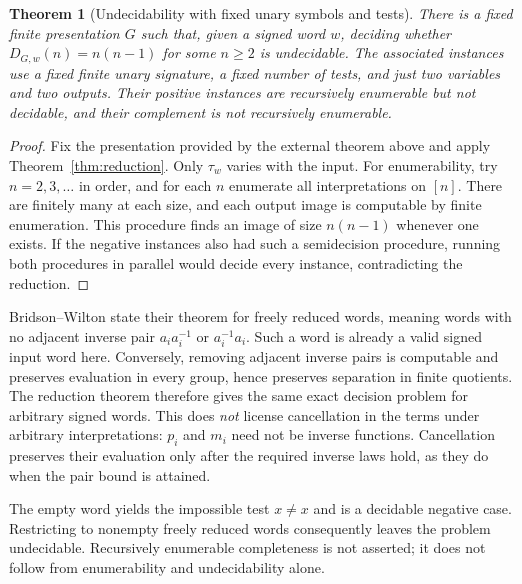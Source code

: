 \documentclass[12pt]{article}
\newtheorem{theorem}{Theorem}[section]
\theoremstyle{definition}
\begin{document}
\begin{theorem}[Undecidability with fixed unary symbols and tests]
\label{thm:fixed-signature}
There is a fixed finite presentation $G$ such that, given a signed
word $w$, deciding whether $D_{G,w}(n)=n(n-1)$ for some $n\ge2$ is
undecidable. The associated instances use a fixed finite unary
signature, a fixed number of tests, and just two variables and two
outputs. Their positive instances are recursively enumerable but not
decidable, and their complement is not recursively enumerable.
\end{theorem}
\begin{proof}
Fix the presentation provided by the external theorem above and apply
Theorem~\ref{thm:reduction}. Only $\tau_w$ varies with the input.
For enumerability, try $n=2,3,\ldots$ in order, and for each $n$
enumerate all interpretations on $[n]$. There are finitely many at
each size, and each output image is computable by finite enumeration.
This procedure finds an image of size $n(n-1)$ whenever one exists.
If the negative instances also had such a semidecision procedure,
running both procedures in parallel would decide every instance,
contradicting the reduction.
\end{proof}

Bridson--Wilton state their theorem for freely reduced words, meaning
words with no adjacent inverse pair $a_i a_i^{-1}$ or $a_i^{-1}a_i$.
Such a word is already a valid signed input word here. Conversely,
removing adjacent inverse pairs is computable and preserves evaluation
in every group, hence preserves separation in finite quotients.
The reduction theorem therefore gives the same exact decision problem
for arbitrary signed words.
This does \emph{not} license cancellation in the terms under arbitrary
interpretations: $p_i$ and $m_i$ need not be inverse functions.
Cancellation preserves their evaluation only after the required inverse
laws hold, as they do when the pair bound is attained.

The empty word yields the impossible test $x\ne x$ and is a decidable
negative case. Restricting to nonempty freely reduced words consequently
leaves the problem undecidable. Recursively enumerable completeness
is not asserted; it does not follow from enumerability and
undecidability alone.
\end{document}
